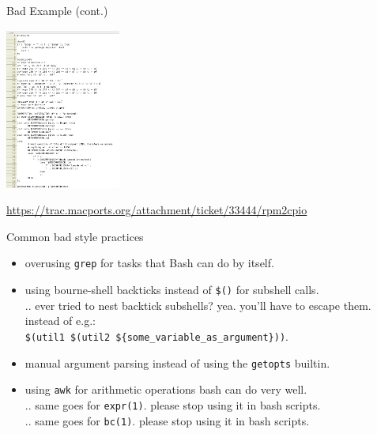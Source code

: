 \begin{frame}{Bad Example (cont.)}

\includegraphics[height=200px]{rpm2cpio}

\tiny
\url{https://trac.macports.org/attachment/ticket/33444/rpm2cpio}

\end{frame}

\begin{frame}{Common bad style practices}

\begin{itemize}
\itemsep1pt\parskip0pt
\item
  overusing \texttt{grep} for tasks that Bash can do by itself.
\item
  using bourne-shell backticks instead of \texttt{\$()} for subshell
  calls.\\ .. ever tried to nest backtick subshells? yea. you'll have to
  escape them. instead of e.g.:\\
  \texttt{\$(util1 \$(util2 \$\{some\_variable\_as\_argument\}))}.
\item
  manual argument parsing instead of using the \texttt{getopts} builtin.
\item
  using \texttt{awk} for arithmetic operations bash can do very well.\\
  .. same goes for \texttt{expr(1)}. please stop using it in bash
  scripts.\\ .. same goes for \texttt{bc(1)}. please stop using it in
  bash scripts.
\end{itemize}

\end{frame}

